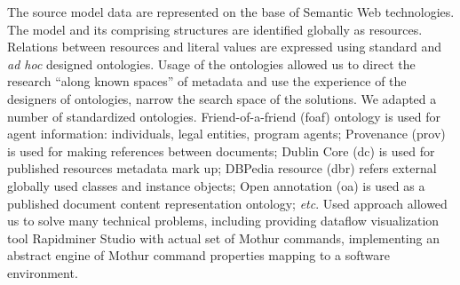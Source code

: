 \documentclass[a4paper]{jpconf}
\begin{document}
The source model data are represented on the base of Semantic Web technologies.  The model and its comprising structures are identified globally as resources.  Relations between resources and literal values are expressed using standard and \emph{ad hoc} designed ontologies.  Usage of the ontologies allowed us to direct the research ``along known spaces'' of metadata and use the experience of the designers of ontologies, narrow the search space of the solutions.
We adapted a number of standardized ontologies. Friend-of-a-friend (foaf) ontology is used for agent information: individuals, legal entities, program agents; Provenance (prov) is used for making references between documents; Dublin Core (dc) is used for published resources metadata mark up; DBPedia resource ({dbr}) refers external globally used classes and instance objects; Open annotation ({oa}) is used as a published document content representation ontology; \emph{etc}. Used approach allowed us to solve many technical problems, including providing dataflow visualization tool Rapidminer Studio with actual set of Mothur commands, implementing an abstract engine of Mothur command properties mapping to a software environment.

\end{document}
